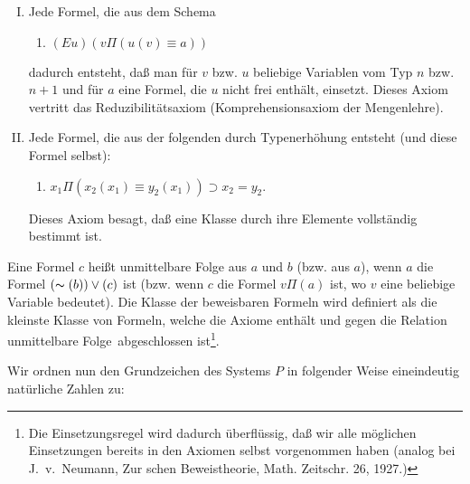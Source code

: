 \documentclass[draft]{scrartcl}
\begin{document}
\begin{enumerate}[I.]
	\item Jede Formel, die aus dem Schema

	\begin{enumerate}[1.]
		\item $\left(Eu\right)\left(v\Pi\left(u\left(v\right) \equiv a\right)\right)$
	\end{enumerate}

	dadurch entsteht, daß man für $v$ bzw. $u$
	beliebige Variablen  vom Typ $n$
	bzw. $n + 1$ und für $a$ eine Formel, die $u$
	nicht frei enthält, einsetzt. Dieses Axiom
	vertritt das Reduzibilitätsaxiom
	(Komprehensionsaxiom der Mengenlehre).

	\item Jede Formel, die aus der folgenden durch
		Typenerhöhung entsteht (und diese Formel selbst):

	\begin{enumerate}[1.]
		\item $x_1\Pi\left(x_2\left(x_1\right)\equiv y_2\left(x_1\right)\right) \supset x_2 = y_2$.
	\end{enumerate}

	Dieses Axiom besagt, daß eine Klasse durch
	ihre Elemente vollständig bestimmt ist.
\end{enumerate}

Eine Formel $c$ heißt unmittelbare Folge aus $a$ und $b$
(bzw. aus $a$), wenn $a$ die Formel $\left(\thicksim\left(b\right)\right)\lor\left(c\right)$
ist (bzw. wenn $c$ die Formel $v\Pi\left(a\right)$ ist,
wo $v$ eine beliebige Variable bedeutet). Die Klasse
der beweisbaren Formeln wird definiert als die kleinste
Klasse von Formeln, welche die Axiome enthält und gegen
die Relation \glqq unmittelbare Folge\grqq\ abgeschlossen
ist\footnote{\label{fussnote24}Die Einsetzungsregel wird
dadurch überflüssig, daß wir alle möglichen Einsetzungen
bereits in den Axiomen selbst vorgenommen haben (analog bei
J.~v.~Neumann, Zur schen Beweistheorie, Math. Zeitschr. 26, 1927.)}.

Wir ordnen nun den Grundzeichen des Systems $P$ in folgender Weise eineindeutig natürliche Zahlen zu:
\end{document}
